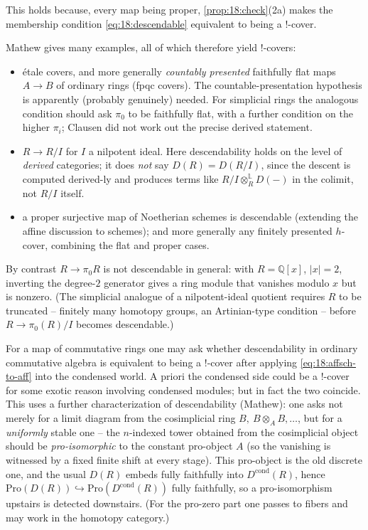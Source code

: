 This holds because, every map being proper, \cref{prop:18:check}(2a) makes the
membership condition \eqref{eq:18:descendable} equivalent to being a $!$-cover.

\begin{example}
\label{ex:18:descendable}
Mathew gives many examples, all of which therefore yield $!$-covers:
\begin{itemize}
\item \'etale covers, and more generally \emph{countably presented} faithfully flat
maps $A\to B$ of ordinary rings (fpqc covers). The countable-presentation
hypothesis is apparently (probably genuinely) needed. For simplicial rings the
analogous condition should ask $\pi_0$ to be faithfully flat, with a further
condition on the higher $\pi_i$; Clausen did not work out the precise derived
statement.
\item $R\to R/I$ for $I$ a nilpotent ideal. Here descendability holds on the level
of \emph{derived} categories; it does \emph{not} say $D(R)=D(R/I)$, since the
descent is computed derived-ly and produces terms like $R/I\otimes^{\mathbb L}_R
D(-)$ in the colimit, not $R/I$ itself.
\item a proper surjective map of Noetherian schemes is descendable (extending the
affine discussion to schemes); and more generally any finitely presented
$h$-cover, combining the flat and proper cases.
\end{itemize}
By contrast $R\to\pi_0 R$ is not descendable in general: with $R=\mathbb{Q}[x]$,
$|x|=2$, inverting the degree-$2$ generator gives a ring module that vanishes
modulo $x$ but is nonzero. (The simplicial analogue of a nilpotent-ideal quotient
requires $R$ to be truncated -- finitely many homotopy groups, an Artinian-type
condition -- before $R\to\pi_0(R)/I$ becomes descendable.)
\end{example}

\begin{remark}
\label{rmk:18:framework-independent}
For a map of commutative rings one may ask whether descendability in ordinary
commutative algebra is equivalent to being a $!$-cover after applying
\eqref{eq:18:affsch-to-aff} into the condensed world. A priori the condensed side
could be a $!$-cover for some exotic reason involving condensed modules; but in fact
the two coincide. This uses a further characterization of descendability (Mathew):
one asks not merely for a limit diagram from the cosimplicial ring
$B,\ B\otimes_A B,\dots$, but for a \emph{uniformly} stable one -- the $n$-indexed
tower obtained from the cosimplicial object should be \emph{pro-isomorphic} to the
constant pro-object $A$ (so the vanishing is witnessed by a fixed finite shift at
every stage). This pro-object is the old discrete one, and the usual $D(R)$ embeds
fully faithfully into $D^{\mathrm{cond}}(R)$, hence
$\mathrm{Pro}(D(R))\hookrightarrow\mathrm{Pro}(D^{\mathrm{cond}}(R))$ fully
faithfully, so a pro-isomorphism upstairs is detected downstairs. (For the
pro-zero part one passes to fibers and may work in the homotopy category.)
\end{remark}

